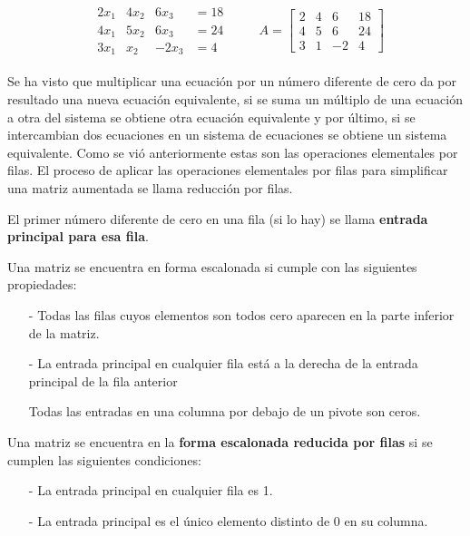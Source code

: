 \documentclass{article}
\begin{document}
\begin{equation*}
    \begin{matrix}
        \begin{array}{rrrr}
            2x_1 & 4x_2 & 6x_3 &=18\\
            4x_1 & 5x_2 & 6x_3 &=24\\
            3x_1 & x_2  & -2x_3 &=4            
        \end{array}
    \end{matrix}
    \quad \quad A = \left[\begin{array}{rrr|r}
        2 & 4 & 6 & 18\\
        4 & 5 & 6 & 24\\
        3 & 1 & -2& 4
    \end{array}\right]
\end{equation*}

Se ha visto que multiplicar una ecuación por un número diferente de cero da por resultado una nueva ecuación equivalente, si se suma un múltiplo de una ecuación a otra del sistema se obtiene otra ecuación equivalente y por último, si se intercambian dos ecuaciones en un sistema de ecuaciones se obtiene un sistema equivalente. Como se vió anteriormente estas son las operaciones elementales por filas. El proceso de aplicar las operaciones elementales por filas para simplificar una matriz aumentada se llama reducción por filas. 

El primer número diferente de cero en una fila (si lo hay) se llama \textbf{entrada principal para esa fila}. 

Una matriz se encuentra en forma escalonada si cumple con las siguientes propiedades:

\begin{tcolorbox}[colback=blue!10!white,colframe=blue!60!black,title=Propiedades de la Forma Escalonada]
    \begin{itemize}
        \item[-] Todas las filas cuyos elementos son todos cero aparecen en la parte inferior de la matriz.
        \item[-] La entrada principal en cualquier fila está a la derecha de la entrada principal de la fila anterior
        \item[] Todas las entradas en una columna por debajo de un pivote son ceros.
    \end{itemize}   
    Una matriz se encuentra en la \textbf{forma escalonada reducida por filas} si se cumplen las siguientes condiciones:
    \begin{itemize}
        \item[-] La entrada principal en cualquier fila es 1.
        \item[-] La entrada principal es el único elemento distinto de 0 en su columna.
    \end{itemize}    
\end{tcolorbox}
\end{document}
